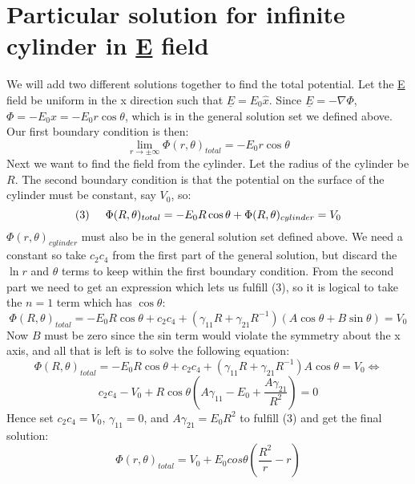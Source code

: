 \documentclass[a4paper,10pt]{article}
\begin{document}
\section*{Particular solution for infinite cylinder in \underline{E} field}
We will add two different solutions together to find the total potential. Let the \underline{E} field be uniform in the x direction
such that $\underline{E} = E_0 \hat{x}$. Since $\underline{E} = - \nabla \Phi$, $\Phi = -E_0 x = -E_0 r \cos\theta$, which is
in the general solution set we defined above.
Our first
boundary condition is then:
\[ \lim_{r \rightarrow \pm \infty} \Phi(r,\theta)_{total} = -E_0 r \cos\theta \]
Next we want to find the field from the cylinder. Let the radius of the cylinder be $R$.
The second boundary condition is that the potential on the surface of the cylinder must be constant,
say $V_0$, so:
\[ (3) \hspace{0.5cm} \Phi(R,\theta)_{total} = -E_0 R \cos\theta + \Phi(R,\theta)_{cylinder} = V_0 \]
$\Phi(r,\theta)_{cylinder}$ must also be in the general solution set defined above. We need a constant so take $c_2 c_4$ from the first
part of the general solution, but discard the
$\ln r$ and $\theta$ terms to keep within the first boundary condition.
From the second part we need to get an expression which lets us fulfill (3), so it is logical to take the $n = 1$ term which has $\cos\theta$:
\[ \Phi(R,\theta)_{total} = -E_0 R \cos\theta +  c_2 c_4 + (\gamma_{11} R + \gamma_{21} R^{-1}) (A\cos\theta + B \sin\theta) = V_0 \]
Now $B$ must be zero since the sin term would violate the symmetry about the x axis, and all that is left is to solve the following equation:
\[ \Phi(R,\theta)_{total} = -E_0 R \cos\theta + c_2 c_4 + (\gamma_{11} R + \gamma_{21} R^{-1}) A\cos\theta = V_0 \Leftrightarrow \]
\[ c_2 c_4 - V_0 + R \cos\theta \left( A\gamma_{11} - E_0 + \frac{A\gamma_{21}}{R^2} \right) = 0 \]
Hence set $c_2 c_4 = V_0$, $\gamma_{11} = 0$, and $A\gamma_{21} = E_0 R^2$ to fulfill (3) and get the final solution:
\[ \Phi(r,\theta)_{total} = V_0 + E_0 cos\theta \left( \frac{R^2}{r} - r \right) \]
\end{document}

